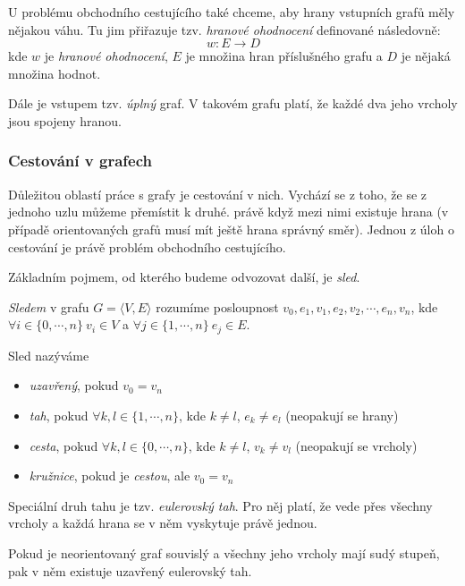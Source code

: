 \documentclass[
  biblatex,
  figures=false,
  glossaries,
  index
]{kidiplom}
\begin{document}
U problému obchodního cestujícího také chceme, aby hrany vstupních grafů měly nějakou váhu. Tu jim přiřazuje tzv. \textit{hranové ohodnocení} definované následovně:
$$w : E \rightarrow D$$
kde $w$ je \textit{hranové ohodnocení}, $E$ je množina hran příslušného grafu a $D$ je nějaká množina hodnot.\newline

Dále je vstupem tzv. \textit{úplný} graf. V takovém grafu platí, že každé dva jeho vrcholy  jsou spojeny hranou.

\subsubsection{Cestování v grafech}
Důležitou oblastí práce s grafy je cestování v nich. Vychází se z toho, že se z jednoho uzlu můžeme přemístit k druhé. právě když mezi nimi existuje hrana (v případě orientovaných grafů musí mít ještě hrana správný směr). Jednou z úloh o cestování je právě problém obchodního cestujícího.


Základním pojmem, od kterého budeme odvozovat další, je \textit{sled}.


\begin{definition}
\textit{Sledem} v grafu $G=\langle V, E \rangle$ rozumíme posloupnost $v_0, e_1, v_1, e_2, v_2, \cdots, e_n, v_n$, kde $\forall i \in \{0,\cdots, n\} \ v_i \in V$ a $\forall j \in \{1, \cdots, n\} \ e_j \in E$.
\end{definition}


Sled nazýváme
\begin{itemize}
\item \textit{uzavřený}, pokud $v_0 = v_n$
\item \textit{tah}, pokud $\forall k, l \in \{1, \cdots, n\}$, kde $k \neq l$, $e_k \neq e_l$ (neopakují se hrany)
\item \textit{cesta}, pokud $\forall k, l \in \{0, \cdots, n\}$, kde $k \neq l$, $v_k \neq v_l$ (neopakují se vrcholy)
\item \textit{kružnice}, pokud je \textit{cestou}, ale $v_0 = v_n$
\end{itemize}

Speciální druh tahu je tzv. \textit{eulerovský tah}. Pro něj platí, že vede přes všechny vrcholy a každá hrana se v něm vyskytuje právě jednou. 

\begin{theorem}\label{theorem:eulerianCircout}
Pokud je neorientovaný graf souvislý a všechny jeho vrcholy mají sudý stupeň, pak v něm existuje uzavřený eulerovský tah.
\end{theorem}
\end{document}

